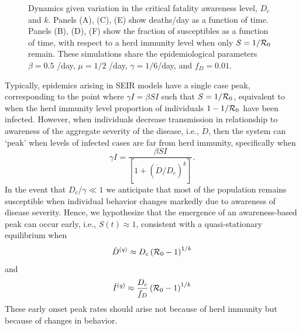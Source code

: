 \begin{figure}[t!]
\begin{center}
\caption{Dynamics given variation in the critical fatality awareness
level, $D_c$ and $k$. Panels (A), (C), (E) show deaths/day as a 
function of time. Panels (B), (D), (F) show the fraction of 
susceptibles as a function of time, with respect to a herd immunity
level when only $S=1/{\cal{R}}_0$ remain.
These simulations share the
epidemiological parameters 
$\beta=0.5$ /day, $\mu=1/2$ /day, $\gamma=1/6$/day,
and $f_D=0.01$.
\label{fig.generic}}
\end{center}
\end{figure}

Typically, epidemics arising in SEIR models have a single case peak, corresponding 
to the point where $\gamma I = \beta S I $ such that 
$S=1/{\cal{R}}_0$, equivalent to when the herd
immunity level proportion of individuals
$1-1/{\cal{R}}_0$ have been infected.
However, when individuals decrease transmission in relationship
to awareness of the aggregate severity of the disease, i.e., $\dot{D}$, 
then the system can `peak' when levels of infected cases are
far from herd immunity, specifically when
\begin{equation}
\gamma I = \frac{\beta SI}{\left[1+\left(\dot{D}/D_c\right)^{k}\right]}.
\end{equation}
In the event that $D_c/\gamma \ll 1$ we anticipate that most of the population
remains susceptible when individual behavior changes markedly
due to awareness of disease severity. Hence, we hypothesize that the
emergence of an
awareness-based peak can occur early, i.e., $S(t)\approx 1$, consistent
with a quasi-stationary equilibrium when
\begin{equation}
\dot{D}^{(q)} \approx D_c\left({\cal{R}}_0-1\right)^{1/k}
\end{equation}
and
\begin{equation}
\dot{I}^{(q)} \approx \frac{D_c}{f_D}\left({\cal{R}}_0-1\right)^{1/k}
\end{equation}
These early onset peak rates should arise not because
of herd immunity but because of changes in behavior. 

